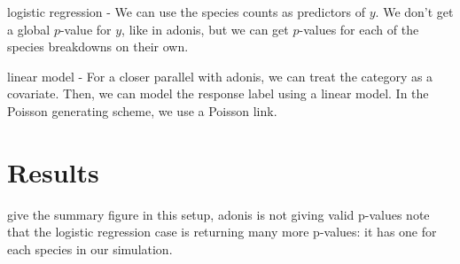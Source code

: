 \documentclass{article}
\begin{document}
logistic regression
- We can use the species counts as predictors of $y$. We don't get a global
$p$-value for $y$, like in adonis, but we can get $p$-values for each of the
species breakdowns on their own.

linear model
- For a closer parallel with adonis, we can treat the category as a covariate.
Then, we can model the response label using a linear model. In the Poisson
generating scheme, we use a Poisson link.

\section{Results}
\label{sec:results}

give the summary figure
in this setup, adonis is not giving valid p-values
note that the logistic regression case is returning many more p-values: it has
one for each species in our simulation.



\end{document}

